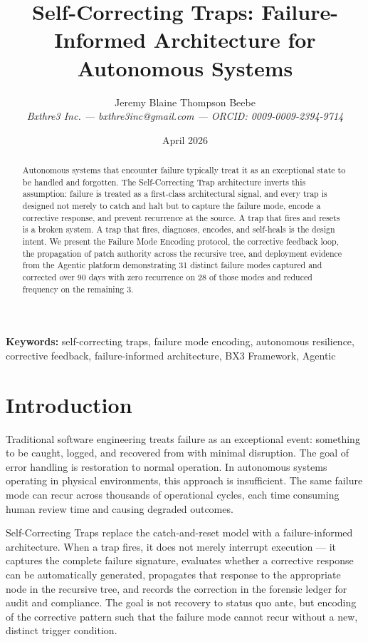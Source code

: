 \documentclass[12pt]{article}
\title{Self-Correcting Traps: Failure-Informed Architecture for Autonomous Systems}
\author{Jeremy Blaine Thompson Beebe\\ \textit{Bxthre3 Inc. --- bxthre3inc@gmail.com --- ORCID: 0009-0009-2394-9714}}
\date{April 2026}
\begin{document}
\maketitle

\begin{abstract}\noindent
Autonomous systems that encounter failure typically treat it as an exceptional state to be handled and forgotten. The Self-Correcting Trap architecture inverts this assumption: failure is treated as a first-class architectural signal, and every trap is designed not merely to catch and halt but to capture the failure mode, encode a corrective response, and prevent recurrence at the source. A trap that fires and resets is a broken system. A trap that fires, diagnoses, encodes, and self-heals is the design intent. We present the Failure Mode Encoding protocol, the corrective feedback loop, the propagation of patch authority across the recursive tree, and deployment evidence from the Agentic platform demonstrating 31 distinct failure modes captured and corrected over 90 days with zero recurrence on 28 of those modes and reduced frequency on the remaining 3.
\end{abstract}

\medskip\noindent\textbf{Keywords:} self-correcting traps, failure mode encoding, autonomous resilience, corrective feedback, failure-informed architecture, BX3 Framework, Agentic

\newpage

\section{Introduction}
Traditional software engineering treats failure as an exceptional event: something to be caught, logged, and recovered from with minimal disruption. The goal of error handling is restoration to normal operation. In autonomous systems operating in physical environments, this approach is insufficient. The same failure mode can recur across thousands of operational cycles, each time consuming human review time and causing degraded outcomes.

Self-Correcting Traps replace the catch-and-reset model with a failure-informed architecture. When a trap fires, it does not merely interrupt execution --- it captures the complete failure signature, evaluates whether a corrective response can be automatically generated, propagates that response to the appropriate node in the recursive tree, and records the correction in the forensic ledger for audit and compliance. The goal is not recovery to status quo ante, but encoding of the corrective pattern such that the failure mode cannot recur without a new, distinct trigger condition.
\end{document}
